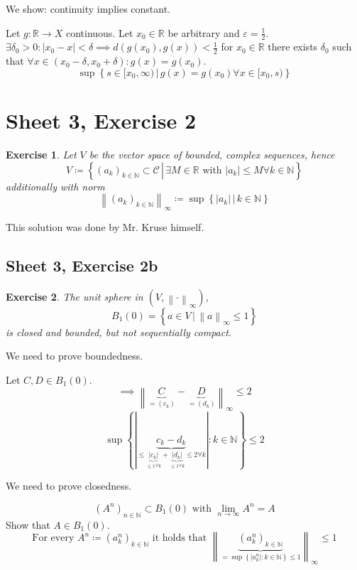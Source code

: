 \documentclass{article}
\newtheorem{ex}{Exercise} %
\newcommand{\set}[1]{\left\{#1\right\}}
\newcommand{\setdef}[2]{\left\{\left.#1\,\right|\,#2\right\}}
\newcommand{\norm}[1]{\left\|#1\right\|}
\newcommand{\card}[1]{\left|#1\right|}
\begin{document}
We show: continuity implies constant.

Let $g: \mathbb R \to X$ continuous.
Let $x_0 \in \mathbb R$ be arbitrary and $\varepsilon = \frac12$.
$\exists \delta_0 > 0: \card{x_0 - x} < \delta \implies d(g(x_0), g(x)) < \frac12$
for $x_0 \in \mathbb R$ there exists $\delta_0$ such that 
$\forall x \in (x_0 - \delta, x_0 + \delta): g(x) = g(x_0)$.
\[ \operatorname{sup}\setdef{s \in [x_0, \infty)}{g(x) = g(x_0) \forall x \in [x_0, s)} \]

\section{Sheet 3, Exercise 2}
\begin{ex}
  Let $V$ be the vector space of bounded, complex sequences, hence
  \[
    V \coloneqq \setdef{(a_k)_{k \in \mathbb N} \subset \mathcal C}{\exists M \in \mathbb R \text{ with } \card{a_k} \leq M \forall k \in \mathbb N}
  \]
  additionally with norm
  \[ \norm{(a_k)_{k \in \mathbb N}}_{\infty} \coloneqq \sup\setdef{\card{a_k}}{k \in \mathbb N} \]
\end{ex}

This solution was done by Mr. Kruse himself.

\subsection{Sheet 3, Exercise 2b}
\begin{ex}
  The unit sphere in $(V, \norm{\cdot}_{\infty})$,
  \[ B_1(0) = \setdef{a \in V}{\norm{a}_{\infty} \leq 1} \]
  is closed and bounded, but not sequentially compact.
\end{ex}

We need to prove boundedness.

Let $C, D \in B_1(0)$.
\[ \implies \norm{\underbrace{C}_{= (c_k)} - \underbrace{D}_{=(d_k)}}_{\infty} \leq 2 \]
\[ \sup\set{\card{\underbrace{c_k - d_k}_{\leq \underbrace{\card{c_k}}_{\leq 1 \forall k} + \underbrace{\card{d_k}}_{\leq 1 \forall k} \leq 2 \forall k } }: k \in \mathbb N} \leq 2 \]

We need to prove closedness.

\[ (A^n)_{n \in \mathbb N} \subset B_1(0) \text{ with } \lim_{n\to\infty} A^n = A \]
Show that $A \in B_1(0)$.
\[ \text{For every } A^n \coloneqq (a^n_k)_{k \in \mathbb N} \text{ it holds that } \norm{\underbrace{(a^n_k)_{k \in \mathbb N}}_{= \sup\set{\card{a^n_k}: k \in \mathbb N} \leq 1}}_{\infty} \leq 1 \]
\end{document}
